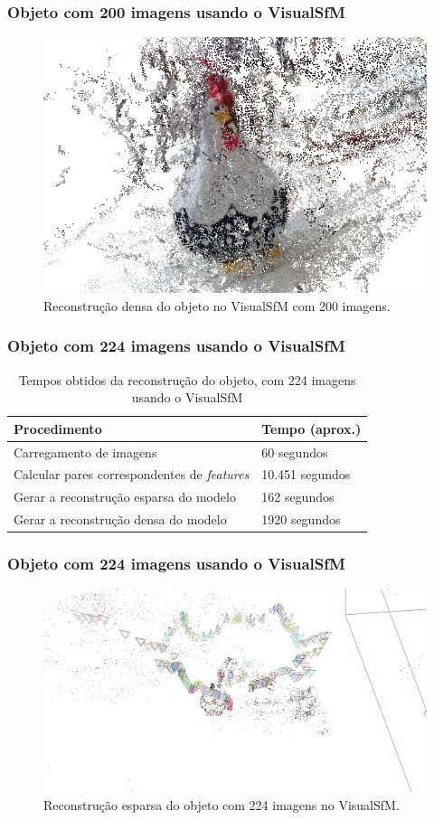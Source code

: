 \documentclass[table, usenames, svgnames, xcolor=dvipsnames]{beamer}
\begin{document}
\begin{frame}
\frametitle{\textbf{Objeto com 200 imagens usando o VisualSfM}}
	\begin{figure}[!h]
		\centering
		\includegraphics[width=0.8\linewidth]{figs/galinhadense.jpg}
		\caption{%
		Reconstrução densa do objeto no VisualSfM com 200 imagens.
		}\label{fig:reconstrucaoDensaVisualSFM}
	\end{figure}
\end{frame}

\begin{frame}
	\frametitle{\textbf{Objeto com 224 imagens usando o VisualSfM}}
	\begin{table}[h!]
		\caption{Tempos obtidos da reconstrução do objeto, com 224 imagens usando o VisualSfM}
		\label{tab:temposSfM224}
		\begin{tabular}{|l|p{3cm}|}
			\hline
			Procedimento & Tempo (aprox.) \\ \hline
			Carregamento de imagens & 60 segundos \\ \hline
			Calcular pares correspondentes de \emph{features} & 10.451 segundos \\ \hline
			Gerar a reconstrução esparsa do modelo & 162 segundos \\ \hline
			Gerar a reconstrução densa do modelo & 1920 segundos \\ \hline
		\end{tabular}
	\end{table}
\end{frame}

\begin{frame}
\frametitle{\textbf{Objeto com 224 imagens usando o VisualSfM}}
	\begin{figure}[!h]
		\centering
		\includegraphics[width=0.7\linewidth]{figs/perto_longe_esparsa.jpg}
		\caption{%
		Reconstrução esparsa do objeto com 224 imagens no VisualSfM.
		}\label{fig:reconstrucaoEsparsaVisualSFM224}
	\end{figure}
\end{frame}
\end{document}
